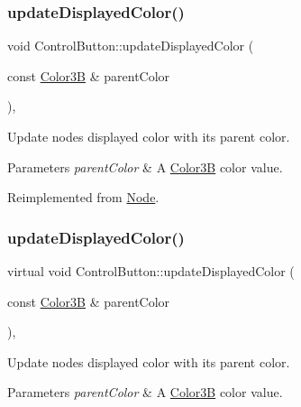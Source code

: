 \subsubsection{\texorpdfstring{update\+Displayed\+Color()}{updateDisplayedColor()}\hspace{0.1cm}{\footnotesize\ttfamily [1/2]}}
{\footnotesize\ttfamily void Control\+Button\+::update\+Displayed\+Color (\begin{DoxyParamCaption}\item[{const \hyperlink{structColor3B}{Color3B} \&}]{parent\+Color }\end{DoxyParamCaption})\hspace{0.3cm}{\ttfamily [override]}, {\ttfamily [virtual]}}

Update node\textquotesingle{}s displayed color with its parent color. 
\begin{DoxyParams}{Parameters}
{\em parent\+Color} & A \hyperlink{structColor3B}{Color3B} color value. \\
\hline
\end{DoxyParams}


Reimplemented from \hyperlink{classNode_ac733bae7b9590f8da746cbc3d1337a2f}{Node}.

\mbox{\label{classControlButton_ab493879910cbb468f4f510a3e9393203}} 
\subsubsection{\texorpdfstring{update\+Displayed\+Color()}{updateDisplayedColor()}\hspace{0.1cm}{\footnotesize\ttfamily [2/2]}}
{\footnotesize\ttfamily virtual void Control\+Button\+::update\+Displayed\+Color (\begin{DoxyParamCaption}\item[{const \hyperlink{structColor3B}{Color3B} \&}]{parent\+Color }\end{DoxyParamCaption})\hspace{0.3cm}{\ttfamily [override]}, {\ttfamily [virtual]}}

Update node\textquotesingle{}s displayed color with its parent color. 
\begin{DoxyParams}{Parameters}
{\em parent\+Color} & A \hyperlink{structColor3B}{Color3B} color value. \\
\hline
\end{DoxyParams}


